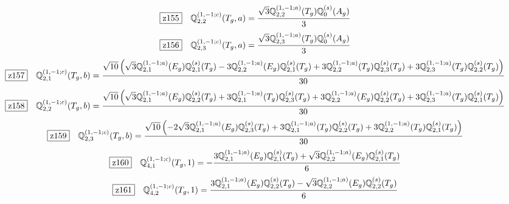 \documentclass[fleqn,10pt,landscape]{jsarticle}
\begin{document}
\begin{dmath*}
\hspace*{3mm}\fbox{z155}\quad \mathbb{Q}_{2,2}^{(1,-1;c)}(T_{g},a)=\frac{\sqrt{3} \mathbb{Q}_{2,2}^{(1,-1;a)}(T_{g}) \mathbb{Q}_{0}^{(s)}(A_{g})}{3}
\end{dmath*}
\begin{dmath*}
\hspace*{3mm}\fbox{z156}\quad \mathbb{Q}_{2,3}^{(1,-1;c)}(T_{g},a)=\frac{\sqrt{3} \mathbb{Q}_{2,3}^{(1,-1;a)}(T_{g}) \mathbb{Q}_{0}^{(s)}(A_{g})}{3}
\end{dmath*}
\begin{dmath*}
\hspace*{3mm}\fbox{z157}\quad \mathbb{Q}_{2,1}^{(1,-1;c)}(T_{g},b)=\frac{\sqrt{10} \left(\sqrt{3} \mathbb{Q}_{2,1}^{(1,-1;a)}(E_{g}) \mathbb{Q}_{2,1}^{(s)}(T_{g}) - 3 \mathbb{Q}_{2,2}^{(1,-1;a)}(E_{g}) \mathbb{Q}_{2,1}^{(s)}(T_{g}) + 3 \mathbb{Q}_{2,2}^{(1,-1;a)}(T_{g}) \mathbb{Q}_{2,3}^{(s)}(T_{g}) + 3 \mathbb{Q}_{2,3}^{(1,-1;a)}(T_{g}) \mathbb{Q}_{2,2}^{(s)}(T_{g})\right)}{30}
\end{dmath*}
\begin{dmath*}
\hspace*{3mm}\fbox{z158}\quad \mathbb{Q}_{2,2}^{(1,-1;c)}(T_{g},b)=\frac{\sqrt{10} \left(\sqrt{3} \mathbb{Q}_{2,1}^{(1,-1;a)}(E_{g}) \mathbb{Q}_{2,2}^{(s)}(T_{g}) + 3 \mathbb{Q}_{2,1}^{(1,-1;a)}(T_{g}) \mathbb{Q}_{2,3}^{(s)}(T_{g}) + 3 \mathbb{Q}_{2,2}^{(1,-1;a)}(E_{g}) \mathbb{Q}_{2,2}^{(s)}(T_{g}) + 3 \mathbb{Q}_{2,3}^{(1,-1;a)}(T_{g}) \mathbb{Q}_{2,1}^{(s)}(T_{g})\right)}{30}
\end{dmath*}
\begin{dmath*}
\hspace*{3mm}\fbox{z159}\quad \mathbb{Q}_{2,3}^{(1,-1;c)}(T_{g},b)=\frac{\sqrt{10} \left(- 2 \sqrt{3} \mathbb{Q}_{2,1}^{(1,-1;a)}(E_{g}) \mathbb{Q}_{2,3}^{(s)}(T_{g}) + 3 \mathbb{Q}_{2,1}^{(1,-1;a)}(T_{g}) \mathbb{Q}_{2,2}^{(s)}(T_{g}) + 3 \mathbb{Q}_{2,2}^{(1,-1;a)}(T_{g}) \mathbb{Q}_{2,1}^{(s)}(T_{g})\right)}{30}
\end{dmath*}
\begin{dmath*}
\hspace*{3mm}\fbox{z160}\quad \mathbb{Q}_{4,1}^{(1,-1;c)}(T_{g},1)=- \frac{3 \mathbb{Q}_{2,1}^{(1,-1;a)}(E_{g}) \mathbb{Q}_{2,1}^{(s)}(T_{g}) + \sqrt{3} \mathbb{Q}_{2,2}^{(1,-1;a)}(E_{g}) \mathbb{Q}_{2,1}^{(s)}(T_{g})}{6}
\end{dmath*}
\begin{dmath*}
\hspace*{3mm}\fbox{z161}\quad \mathbb{Q}_{4,2}^{(1,-1;c)}(T_{g},1)=\frac{3 \mathbb{Q}_{2,1}^{(1,-1;a)}(E_{g}) \mathbb{Q}_{2,2}^{(s)}(T_{g}) - \sqrt{3} \mathbb{Q}_{2,2}^{(1,-1;a)}(E_{g}) \mathbb{Q}_{2,2}^{(s)}(T_{g})}{6}
\end{dmath*}
\end{document}
